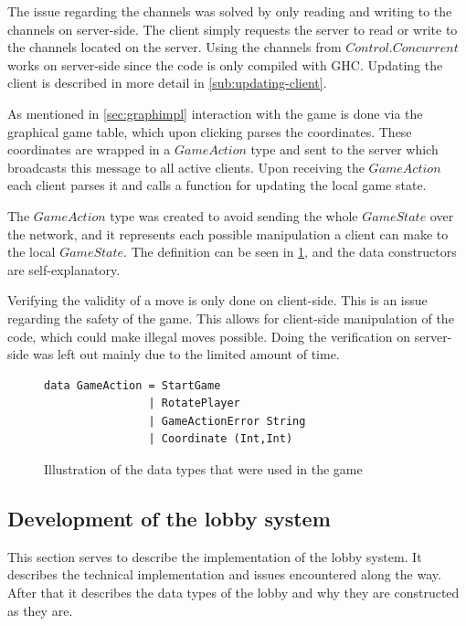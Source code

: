 \documentclass[a4paper]{article}
\begin{document}
The issue regarding the channels was solved by only reading and writing to the channels on server-side. The client simply requests the server to read or write to the channels located on the server. Using the channels from $Control.Concurrent$ works on server-side since the code is only compiled with GHC. Updating the client is described in more detail in \cref{sub:updating-client}.

As mentioned in \cref{sec:graphimpl} interaction with the game is done via the graphical game table, which upon clicking parses the coordinates. These coordinates are wrapped in a $GameAction$ type and sent to the server which broadcasts this message to all active clients. Upon receiving the $GameAction$ each client parses it and calls a function for updating the local game state.

The $GameAction$ type was created to avoid sending the whole $GameState$ over the network, and it represents each possible manipulation a client can make to the local $GameState$. The definition can be seen in \cref{fig:gameAction}, and the data constructors are self-explanatory.

Verifying the validity of a move is only done on client-side. This is an issue regarding the safety of the game. This allows for client-side manipulation of the code, which could make illegal moves possible. Doing the verification on server-side was left out mainly due to the limited amount of time. 


\begin{figure}[H]
\begin{lstlisting}
data GameAction = StartGame 
                | RotatePlayer 
                | GameActionError String 
                | Coordinate (Int,Int)
\end{lstlisting}
    \caption{Illustration of the data types that were used in the game}
    \label{fig:gameAction}
\end{figure}


\subsection{Development of the lobby system}
\label{sub:lobby-development}
This section serves to describe the implementation of the lobby system. It describes the technical implementation and issues encountered along the way. After that it describes the data types of the lobby and why they are constructed as they are.
\end{document}
